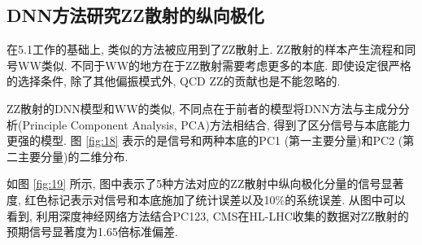 \documentclass{SCIS2020cn}
\begin{document}
\subsection{DNN方法研究ZZ散射的纵向极化}

在5.1工作的基础上, 类似的方法被应用到了ZZ散射上. ZZ散射的样本产生流程和同号WW类似. 不同于WW的地方在于ZZ散射需要考虑更多的本底. 即使设定很严格的选择条件, 除了其他偏振模式外, QCD
ZZ的贡献也是不能忽略的. 

ZZ散射的DNN模型和WW的类似, 不同点在于前者的模型将DNN方法与主成分分析(Principle Component Analysis, PCA)方法相结合, 得到了区分信号与本底能力更强的模型. 图 \ref{fig:18} 表示的是信号和两种本底的PC1 (第一主要分量)和PC2 (第二主要分量)的二维分布. 

如图 \ref{fig:19} 所示, 图中表示了5种方法对应的ZZ散射中纵向极化分量的信号显著度, 红色标记表示对信号和本底施加了统计误差以及10\%的系统误差. 从图中可以看到, 利用深度神经网络方法结合PC123, CMS在HL-LHC收集的数据对ZZ散射的预期信号显著度为1.65倍标准偏差. 
\end{document}
